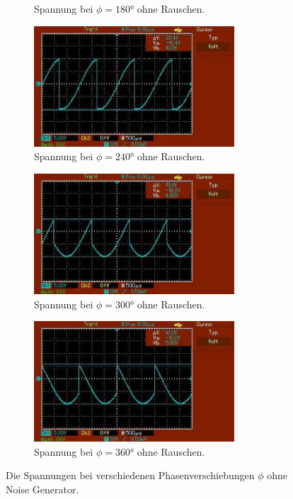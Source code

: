 \begin{figure}[H]
\begin{subfigure}{0.42\textwidth}
      \caption{Spannung bei $\phi = 180°$ ohne Rauschen.}
  \end{subfigure}
\hfill 
  \begin{subfigure}{0.42\textwidth}
      \centering
      \includegraphics[height=4.5cm]{content/abbildungen/ohne/240.pdf}
      \caption{Spannung bei $\phi = 240°$ ohne Rauschen.}
      \end{subfigure}
\hfill 
  \begin{subfigure}{0.42\textwidth}
      \centering
      \includegraphics[height=4.5cm]{content/abbildungen/ohne/300.pdf}
      \caption{Spannung bei $\phi = 300°$ ohne Rauschen.}
      \end{subfigure}
\hfill 
  \begin{subfigure}{0.42\textwidth}
      \centering
      \includegraphics[height=4.5cm]{content/abbildungen/ohne/360.pdf}
      \caption{Spannung bei $\phi = 360°$ ohne Rauschen.}
      \end{subfigure}
\caption{Die Spannungen bei verschiedenen Phasenverschiebungen $\phi$ ohne Noise Generator.}
\label{fig:ohne}
\end{figure}

